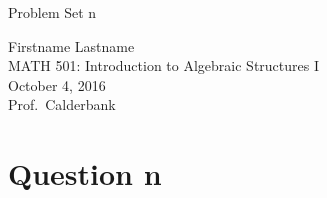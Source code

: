 \documentclass[letterpaper]{article}
\def\name{Problem Set n}
\begin{document}
{\huge \name}


\vspace{0.25in}

Firstname Lastname \\
MATH 501: Introduction to Algebraic Structures I \\
October 4, 2016 \\
Prof.\ Calderbank \\

\section*{Question n}
\label{sec:Question n}
\end{document}
